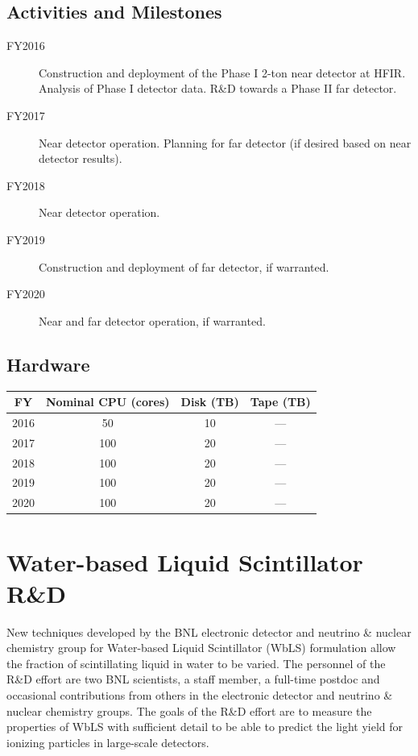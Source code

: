 \documentclass[pdftex,12pt,letter]{article}
\begin{document}
\subsection{Activities and Milestones}

\begin{description}
\item[FY2016] Construction and deployment of the Phase I 2-ton near detector at HFIR.
				Analysis of Phase I detector data. R\&D towards a Phase II far detector.
\item[FY2017] Near detector operation. Planning for far detector (if desired based on near
			detector results).
\item[FY2018] Near detector operation. 
\item[FY2019] Construction and deployment of far detector, if warranted.
\item[FY2020] Near and far detector operation, if warranted.
\end{description}

\subsection{Hardware}
\begin{table}[tbh]
\centering
\begin{tabular}{|c|c|c|c|}
\hline
FY & Nominal CPU (cores) & Disk (TB) & Tape (TB) \\
\hline
2016 &  50  & 10 & --- \\
\hline
2017 &  100 & 20  & ---  \\
\hline
2018 &  100 & 20  & --- \\
\hline
2019  & 100 & 20 & ---  \\
\hline
2020 &  100  & 20 & --- \\
\hline
\end{tabular}
\end{table}

\pagebreak
\section{Water-based Liquid Scintillator R\&D}
New techniques developed by the BNL electronic detector and neutrino
\& nuclear chemistry group for Water-based Liquid Scintillator (WbLS)
formulation allow the fraction of scintillating liquid in water to be
varied. 
The personnel of the R\&D effort are two BNL scientists, a staff
member, a full-time postdoc and occasional contributions from others
in the electronic detector and neutrino \& nuclear chemistry groups.   
The goals of the R\&D effort are to measure the properties of WbLS
with sufficient detail to be able to predict the light yield for
ionizing particles in large-scale detectors.
\end{document}

